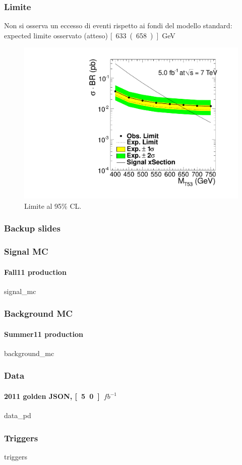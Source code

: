\documentclass[italian]{beamer}
\begin{document}
\begin{frame}
    \frametitle{Limite}
    Non si osserva un eccesso di eventi rispetto ai fondi del
    modello standard:
    {expected}
    \alert{limite osservato (atteso)} \unit[633 (658)]{GeV}
    \begin{figure}[h]
        \centering
    \includegraphics[height=.55\textheight]{oLimit_limit_macro_4jets_opt_btag_200_350_02}
        \caption{Limite al 95\% CL.}
    \end{figure}
\end{frame}

\begin{frame}
    \frametitle{Backup slides}
\end{frame}

\begin{frame}
    \frametitle{Signal MC}
    \framesubtitle{Fall11 production}
    {signal_mc}
\end{frame}

\begin{frame}
    \frametitle{Background MC}
    \framesubtitle{Summer11 production}
    {background_mc}
\end{frame}

\begin{frame}
    \frametitle{Data}
    \framesubtitle{2011 golden JSON, \unit[5.0]{$fb^{-1}$}}
    {data_pd}
\end{frame}

\begin{frame}
    \frametitle{Triggers}
    {triggers}
\end{frame}
\end{document}
